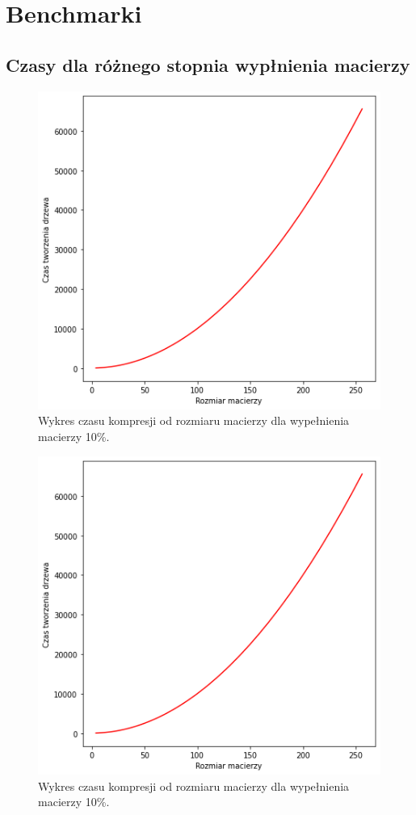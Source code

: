 \documentclass{article}
\begin{document}
\section{Benchmarki}

\subsection{Czasy dla różnego stopnia wypłnienia macierzy}

\begin{figure}[H]
    \centering
  \includegraphics[width=0.6\linewidth]{img/output.png}
  \caption{Wykres czasu kompresji od rozmiaru macierzy dla wypełnienia macierzy 10\%.}
\end{figure}

\begin{figure}[H]
    \centering
  \includegraphics[width=0.6\linewidth]{img/output.png}
  \caption{Wykres czasu kompresji od rozmiaru macierzy dla wypełnienia macierzy 10\%.}
\end{figure}
\end{document}

